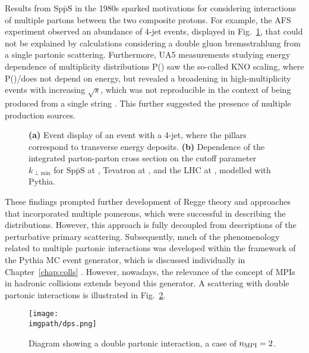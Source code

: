Results from $\mathrm{Sp\bar{p}S}$ in the 1980s sparked motivations for considering interactions of multiple partons between the two composite protons. For example, the AFS experiment observed an abundance of 4-jet events, displayed in Fig.~\ref{fig:intro:afs4jet}, that could not be explained by calculations considering a double gluon bremsstrahlung from a single partonic scattering\cite{akessonDoublePartonScattering1987}. Furthermore, UA5 measurements studying energy dependence of multiplicity distributions P(\Nch) saw the so-called KNO scaling\cite{kobaScalingMultiplicityDistributions1972}, where P(\Nch)/\meanNch does not depend on energy, but revealed a broadening in high-multiplicity events with increasing $\sqrt{s}$\cite{alnerScalingViolationFavouring1984,ansorgeChargedParticleMultiplicity1989}, which was not reproducible in the context of \Nch being produced from a single string \cite{sjostrandDevelopmentMPIModelling2017}. This further suggested the presence of multiple production sources.

\begin{figure}[H]
\caption{\textbf{(a)} Event display of an event with a 4-jet, where the pillars correspond to transverse energy deposits. \cite{akessonDoublePartonScattering1987} \textbf{(b)} Dependence of the integrated parton-parton cross section on the cutoff parameter $k_{\perp \mathrm{min}}$ for $\mathrm{Sp\bar{p}S}$ at , Tevatron at , and the LHC at , modelled with Pythia. \cite{sjostrandDevelopmentMPIModelling2017}}
\label{fig:intro:afs4jet}
\end{figure}

These findings prompted further development of Regge theory and approaches that incorporated multiple pomerons, which were successful in describing the \Nch distributions. However, this approach is fully decoupled from descriptions of the perturbative primary scattering. Subsequently, much of the phenomenology related to multiple partonic interactions was developed within the framework of the Pythia MC event generator, which is discussed individually in Chapter~\ref{chap:colls} \cite{sjostrandDevelopmentMPIModelling2017}. However, nowadays, the relevance of the concept of MPIs in hadronic collisions extends beyond this generator. A scattering with double partonic interactions is illustrated in Fig.~\ref{fig:intro:dps}.

\begin{figure}[H]
\texttt{[image: \\imgpath/dps.png]}
\caption{Diagram showing a double partonic interaction, a case of $n_{\rm MPI}=2$. \cite{prestelParticlePhysicsPhenomenology}}
\label{fig:intro:dps}
\end{figure}

